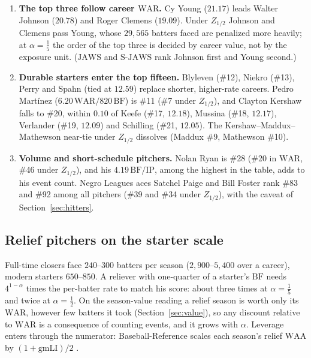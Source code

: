 \documentclass[11pt,letterpaper]{article}
\theoremstyle{plain}
\theoremstyle{definition}
\theoremstyle{remark}
\newcommand{\WAR}{\mathrm{WAR}}
\newcommand{\WAA}{\mathrm{WAA}}
\newcommand{\BF}{\mathrm{BF}}
\newcommand{\IP}{\mathrm{IP}}
\newcommand{\JAWS}{\mathrm{JAWS}}
\newcommand{\SJAWS}{\mathrm{S\text{-}JAWS}}
\begin{document}
\begin{enumerate}
    \item \textbf{The top three follow career $\WAR$.} Cy Young ($21.17$) leads Walter Johnson ($20.78$) and Roger Clemens ($19.09$). Under $Z_{1/2}$ Johnson and Clemens pass Young, whose $29{,}565$ batters faced are penalized more heavily; at $\alpha = \tfrac15$ the order of the top three is decided by career value, not by the exposure unit. ($\JAWS$ and $\SJAWS$ rank Johnson first and Young second.)
    \item \textbf{Durable starters enter the top fifteen.} Blyleven (\#12), Niekro (\#13), Perry and Spahn (tied at $12.59$) replace shorter, higher-rate careers. Pedro Mart\'{i}nez ($6.20\,\WAR/820\,\BF$) is \#11 (\#7 under $Z_{1/2}$), and Clayton Kershaw falls to \#20, within $0.10$ of Keefe (\#17, $12.18$), Mussina (\#18, $12.17$), Verlander (\#19, $12.09$) and Schilling (\#21, $12.05$). The Kershaw--Maddux--Mathewson near-tie under $Z_{1/2}$ dissolves (Maddux \#9, Mathewson \#10).
    \item \textbf{Volume and short-schedule pitchers.} Nolan Ryan is \#28 (\#20 in $\WAR$, \#46 under $Z_{1/2}$), and his $4.19\,\BF/\IP$, among the highest in the table, adds to his event count. Negro Leagues aces Satchel Paige and Bill Foster rank \#83 and \#92 among all pitchers (\#39 and \#34 under $Z_{1/2}$), with the caveat of Section~\ref{sec:hitters}.
\end{enumerate}

\subsection{Relief pitchers on the starter scale}
\label{sec:relievers}

Full-time closers face $240$--$300$ batters per season ($2{,}900$--$5{,}400$ over a career), modern starters $650$--$850$. A reliever with one-quarter of a starter's $\BF$ needs $4^{1-\alpha}$ times the per-batter rate to match his score: about three times at $\alpha = \tfrac15$ and twice at $\alpha = \tfrac12$. On the season-value reading a relief season is worth only its $\WAR$, however few batters it took (Section~\ref{sec:value}), so any discount relative to $\WAR$ is a consequence of counting events, and it grows with $\alpha$. Leverage enters through the numerator: Baseball-Reference scales each season's relief $\WAA$ by $(1+\mathrm{gmLI})/2$ \cite{bbrefwarpitch}.
\end{document}
